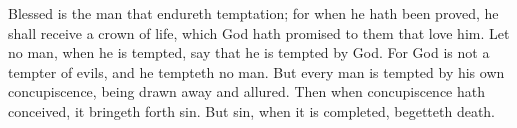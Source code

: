 Blessed is the man that endureth temptation; for when he hath been proved, he shall receive a crown of life, which God hath promised to them that love him.
Let no man, when he is tempted, say that he is tempted by God. For God is not a tempter of evils, and he tempteth no man.
But every man is tempted by his own concupiscence, being drawn away and allured.
Then when concupiscence hath conceived, it bringeth forth sin. But sin, when it is completed, begetteth death.
